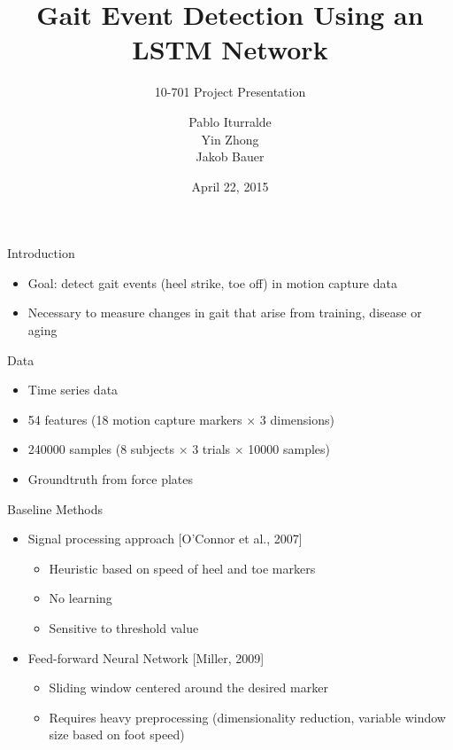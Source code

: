 \documentclass{beamer}
\title
{
    Gait Event Detection Using an LSTM Network
}
\subtitle
{
    10-701
    Project Presentation
}
\author
{
    Pablo Iturralde\\
    Yin Zhong\\
    Jakob Bauer
}
\date
{
    April 22, 2015
}
\begin{document}
\begin{frame}
  \titlepage
\end{frame}

\begin{frame}{Introduction}
    \begin{itemize}
        \item
            Goal: detect gait events (heel strike, toe off) 
            in motion capture data
        \item
            Necessary to measure changes in gait that arise from training,
            disease or aging
    \end{itemize}
\end{frame}

\begin{frame}{Data}
    \begin{itemize}
        \item
            Time series data
        \item
            54 features 
            (18 motion capture markers $\times$ 3 dimensions)
        \item
            \num{240000} samples 
            (8 subjects $\times$ 3 trials $\times$ \num{10000} samples)
        \item
            Groundtruth from force plates
    \end{itemize}
\end{frame}

\begin{frame}{Baseline Methods}
    \begin{itemize}
        \item
            Signal processing approach [O'Connor et al., 2007]
            \begin{itemize}
                \item
                    Heuristic based on speed of heel and toe markers
                \item
                    No learning
                \item
                    Sensitive to threshold value
            \end{itemize}
        \item
            Feed-forward Neural Network [Miller, 2009]
            \begin{itemize}
                \item
                    Sliding window centered around the desired marker
                \item
                    Requires heavy preprocessing (dimensionality reduction,
                    variable window size based on foot speed)
            \end{itemize}
    \end{itemize}
\end{frame}
\end{document}
